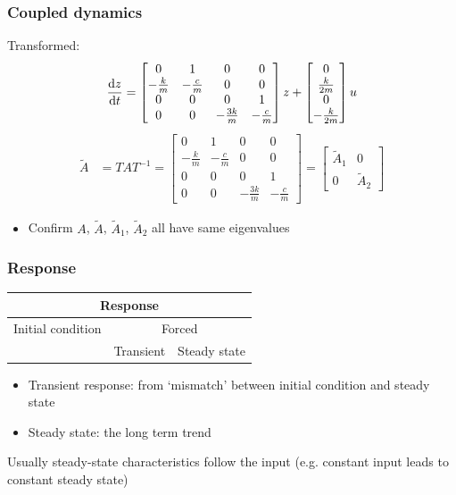\documentclass[10pt]{beamer-control}
\begin{document}
\begin{frame}
  \frametitle{Coupled dynamics}
  Transformed:
  \begin{equation}
    \frac{\mathrm{d} z}{\mathrm{d} t} =
    \begin{bmatrix}
      0 & 1 & 0 & 0 \\
      -\frac{k}{m} & -\frac{c}{m} & 0 & 0 \\
      0 & 0 & 0 & 1 \\
      0 & 0 & -\frac{3k}{m} & -\frac{c}{m}
    \end{bmatrix}
    z +
    \begin{bmatrix}
      0 \\
      \frac{k}{2m} \\
      0 \\
      -\frac{k}{2m}
    \end{bmatrix}
    u
  \end{equation}
  \begin{align}
    \tilde A &= TAT^{-1} =
    \begin{bmatrix}
      0 & 1 & 0 & 0 \\
      -\frac{k}{m} & -\frac{c}{m} & 0 & 0 \\
      0 & 0 & 0 & 1 \\
      0 & 0 & -\frac{3k}{m} & -\frac{c}{m}
    \end{bmatrix}
    =
    \begin{bmatrix}
      \tilde A_1 & 0 \\
      0 & \tilde A_2
    \end{bmatrix}
  \end{align}
  \begin{itemize}
    \item Confirm $A$, $\tilde A$, $\tilde A_1$, $\tilde A_2$ all have same eigenvalues
  \end{itemize}

\end{frame}


\begin{frame}
  \frametitle{Response}

  \begin{tabular}{|p{2cm}|p{2cm}|p{2cm}|p{2cm}|}
    \hline
    \multicolumn{4}{|c|}{Response}\\
    \hline
    \multicolumn{2}{|c|}{Initial condition} & \multicolumn{2}{c|}{Forced}\\
    \hline
    &  & Transient & Steady state\\
    \hline
  \end{tabular}
  \bigskip

  \begin{itemize}
    \item
      Transient response: from `mismatch' between initial condition and steady state
    \item
      Steady state: the long term trend
  \end{itemize}
  \bigskip

  Usually steady-state characteristics follow the input (e.g. constant input leads to constant steady state)

\end{frame}
\end{document}
